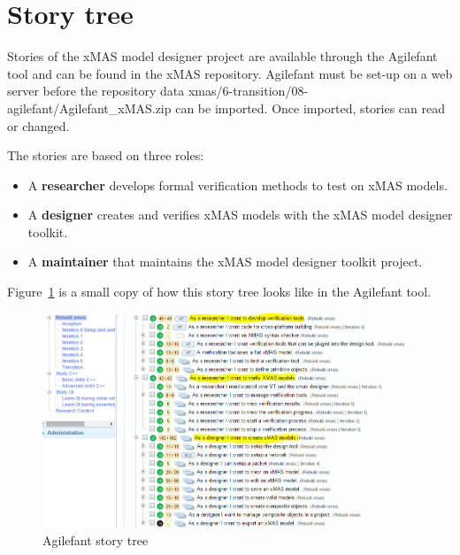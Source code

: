 \section{Story tree}

Stories of the xMAS model designer project are available through the Agilefant
tool and can be found in the xMAS repository. Agilefant must be set-up on a web
server before the repository data xmas/6-transition/08-agilefant/Agilefant\_xMAS.zip
can be imported. Once imported, stories can read or changed.

The stories are based on three roles:
\begin{itemize}
\item A \textbf{researcher} develops formal verification methods to test on xMAS models.
\item A \textbf{designer} creates and verifies xMAS models with the xMAS model designer toolkit.
\item A \textbf{maintainer} that maintains the xMAS model designer toolkit project.
\end{itemize}

Figure~\ref{fig:story-tree} is a small copy of how this story tree looks like in the Agilefant tool.


\begin{figure}[here]
\begin{center}	
	\includegraphics[width=.70\linewidth]{pictures/story-tree}
	\caption{Agilefant story tree}
	\label{fig:story-tree}
\end{center}
\end{figure}

